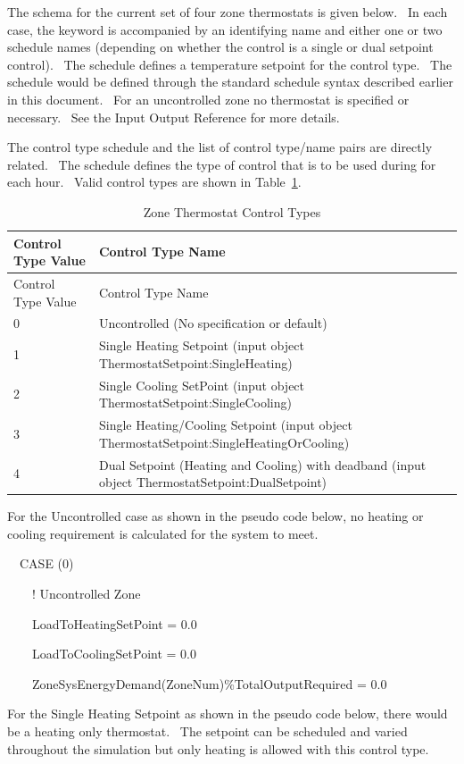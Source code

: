 The schema for the current set of four zone thermostats is given below.~ In each case, the keyword is accompanied by an identifying name and either one or two schedule names (depending on whether the control is a single or dual setpoint control).~ The schedule defines a temperature setpoint for the control type.~ The schedule would be defined through the standard schedule syntax described earlier in this document.~ For an uncontrolled zone no thermostat is specified or necessary.~ See the Input Output Reference for more details.

The control type schedule and the list of control type/name pairs are directly related.~ The schedule defines the type of control that is to be used during for each hour.~ Valid control types are shown in Table~\ref{table:zone-thermostat-control-types}.

\begin{longtable}[c]{p{1.5in}p{4.5in}}
\caption{Zone Thermostat Control Types \label{table:zone-thermostat-control-types}} \tabularnewline
\toprule
Control Type Value & Control Type Name \tabularnewline
\midrule
\endfirsthead

\toprule
Control Type Value & Control Type Name \tabularnewline
\midrule
\endhead

0 & Uncontrolled (No specification or default) \tabularnewline
1 & Single Heating Setpoint (input object ThermostatSetpoint:SingleHeating) \tabularnewline
2 & Single Cooling SetPoint (input object ThermostatSetpoint:SingleCooling) \tabularnewline
3 & Single Heating/Cooling Setpoint (input object ThermostatSetpoint:SingleHeatingOrCooling) \tabularnewline
4 & Dual Setpoint (Heating and Cooling) with deadband (input object ThermostatSetpoint:DualSetpoint) \tabularnewline
\bottomrule
\end{longtable}

For the Uncontrolled case as shown in the pseudo code below, no heating or cooling requirement is calculated for the system to meet.

~~CASE (0)

~~~~! Uncontrolled Zone

~~~~LoadToHeatingSetPoint = 0.0

~~~~LoadToCoolingSetPoint = 0.0

~~~~ZoneSysEnergyDemand(ZoneNum)\%TotalOutputRequired = 0.0

For the Single Heating Setpoint as shown in the pseudo code below, there would be a heating only thermostat.~ The setpoint can be scheduled and varied throughout the simulation but only heating is allowed with this control type.

